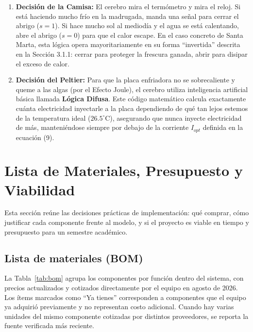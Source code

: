 \documentclass[11pt,a4paper]{article}
\begin{document}
\begin{enumerate}
    \item \textbf{Decisión de la Camisa:} El cerebro mira el termómetro y mira el reloj. Si está haciendo mucho frío en la madrugada, manda una señal para cerrar el abrigo ($s=1$). Si hace mucho sol al mediodía y el agua se está calentando, abre el abrigo ($s=0$) para que el calor escape. En el caso concreto de Santa Marta, esta lógica opera mayoritariamente en su forma ``invertida'' descrita en la Sección 3.1.1: cerrar para proteger la frescura ganada, abrir para disipar el exceso de calor.
    \item \textbf{Decisión del Peltier:} Para que la placa enfriadora no se sobrecaliente y queme a las algas (por el Efecto Joule), el cerebro utiliza inteligencia artificial básica llamada \textbf{Lógica Difusa}. Este código matemático calcula exactamente cuánta electricidad inyectarle a la placa dependiendo de qué tan lejos estemos de la temperatura ideal ($26.5^\circ$C), asegurando que nunca inyecte electricidad de más, manteniéndose siempre por debajo de la corriente $I_{opt}$ definida en la ecuación (9).
\end{enumerate}

\section{Lista de Materiales, Presupuesto y Viabilidad}
Esta sección reúne las decisiones prácticas de implementación: qué comprar, cómo justificar cada componente frente al modelo, y si el proyecto es viable en tiempo y presupuesto para un semestre académico.

\subsection{Lista de materiales (BOM)}
La Tabla~\ref{tab:bom} agrupa los componentes por función dentro del sistema, con precios actualizados y cotizados directamente por el equipo en agosto de 2026. Los ítems marcados como ``Ya tienes'' corresponden a componentes que el equipo ya adquirió previamente y no representan costo adicional. Cuando hay varias unidades del mismo componente cotizadas por distintos proveedores, se reporta la fuente verificada más reciente.
\end{document}
